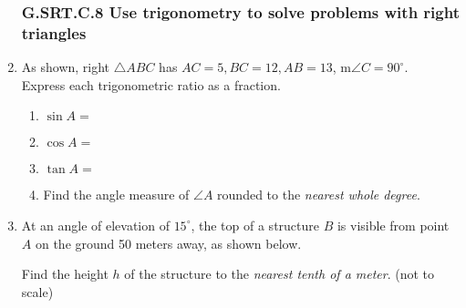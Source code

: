 \documentclass[12pt, twoside]{article}
\begin{document}
\begin{enumerate}[itemsep=0.5cm]
\subsubsection*{G.SRT.C.8 Use trigonometry to solve problems with right triangles}
\item As shown, right $\triangle ABC$ has $AC=5, BC=12, AB=13$, m$\angle C=90^\circ$. \\[0.25cm] 
Express each trigonometric ratio as a fraction.
  \begin{multicols}{2}
    \begin{enumerate}
      \item $\sin A =$
      \item $\cos A =$
      \item $\tan A =$ 
      \item Find the angle measure of $\angle A$ rounded to the \emph{nearest whole degree}. \vspace{1cm}
    \end{enumerate}
    \begin{center}
    \end{center}
  \end{multicols}\vspace{0.25cm}

\item At an angle of elevation of $15^\circ$, the top of a structure $B$ is visible from point $A$ on the ground 50 meters away, as shown below.

  Find the height $h$ of the structure to the \emph{nearest tenth of a meter}. \hfill (not to scale)
    \begin{flushright}
      \end{flushright}




\end{enumerate}
\end{document}
